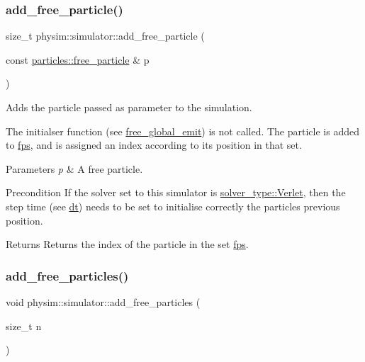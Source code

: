 \subsubsection{\texorpdfstring{add\+\_\+free\+\_\+particle()}{add\_free\_particle()}\hspace{0.1cm}{\footnotesize\ttfamily [2/2]}}
{\footnotesize\ttfamily size\+\_\+t physim\+::simulator\+::add\+\_\+free\+\_\+particle (\begin{DoxyParamCaption}\item[{const \hyperlink{classphysim_1_1particles_1_1free__particle}{particles\+::free\+\_\+particle} \&}]{p }\end{DoxyParamCaption})}



Adds the particle passed as parameter to the simulation. 

The initialser function (see \hyperlink{classphysim_1_1simulator_a05e2840fc39c644d7005ea938e63202f}{free\+\_\+global\+\_\+emit}) is not called. The particle is added to \hyperlink{classphysim_1_1simulator_a4f92b1da1d5e8e0c35d6339991b4d7ce}{fps}, and is assigned an index according to its position in that set. 
\begin{DoxyParams}{Parameters}
{\em p} & A free particle. \\
\hline
\end{DoxyParams}
\begin{DoxyPrecond}{Precondition}
If the solver set to this simulator is \hyperlink{namespacephysim_a09adeda29c09e651877e880d31fc9686ac1f9df543f33d8a79fb2437c853f09b9}{solver\+\_\+type\+::\+Verlet}, then the step time (see \hyperlink{classphysim_1_1simulator_a12a60d0ed819937b51ce50162dbdd6e1}{dt}) needs to be set to initialise correctly the particle\textquotesingle{}s previous position. 
\end{DoxyPrecond}
\begin{DoxyReturn}{Returns}
Returns the index of the particle in the set \hyperlink{classphysim_1_1simulator_a4f92b1da1d5e8e0c35d6339991b4d7ce}{fps}. 
\end{DoxyReturn}
\mbox{\label{classphysim_1_1simulator_a8729cd8c3590730d8897f61f2320f3e8}} 
\subsubsection{\texorpdfstring{add\+\_\+free\+\_\+particles()}{add\_free\_particles()}}
{\footnotesize\ttfamily void physim\+::simulator\+::add\+\_\+free\+\_\+particles (\begin{DoxyParamCaption}\item[{size\+\_\+t}]{n }\end{DoxyParamCaption})}



